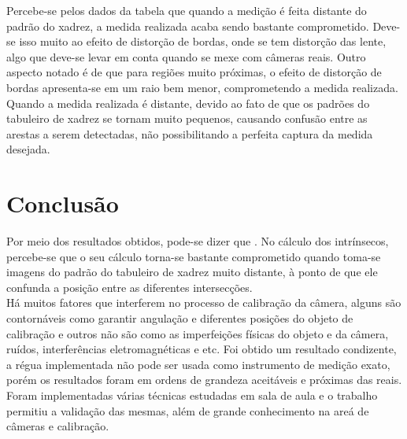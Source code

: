 \documentclass{bmvc2k}
\begin{document}
Percebe-se pelos dados da tabela que quando a medição é feita distante do padrão do xadrez, a medida realizada acaba sendo bastante comprometido. Deve-se isso muito ao efeito de distorção de bordas, onde se tem distorção das lente\cite{Hull01}, algo que deve-se levar em conta quando se mexe com câmeras reais. Outro aspecto notado é de que para regiões muito próximas, o efeito de distorção de bordas apresenta-se em um raio bem menor, comprometendo a medida realizada. Quando a medida realizada é distante, devido ao fato de que os padrões do tabuleiro de xadrez se tornam muito pequenos, causando confusão entre as arestas a serem detectadas, não possibilitando a perfeita captura da medida desejada.\\


\section{Conclusão}

Por meio dos resultados obtidos, pode-se dizer que . No cálculo dos intrínsecos, percebe-se que o seu cálculo torna-se bastante comprometido quando toma-se imagens do padrão do tabuleiro de xadrez muito distante, à ponto de que ele confunda a posição entre as diferentes intersecções.\\
Há muitos fatores que interferem no processo de calibração da câmera, alguns são contornáveis como garantir angulação e diferentes posições do objeto de calibração e outros não são como as imperfeições físicas do objeto e da câmera, ruídos, interferências eletromagnéticas e etc. Foi obtido um resultado condizente, a régua implementada não pode ser usada como instrumento de medição exato, porém os resultados foram em ordens de grandeza aceitáveis e próximas das reais. \\
Foram  implementadas várias técnicas estudadas em sala de aula e o trabalho permitiu a validação das mesmas, além de grande conhecimento na areá de câmeras e calibração.

\newpage

\end{document}
